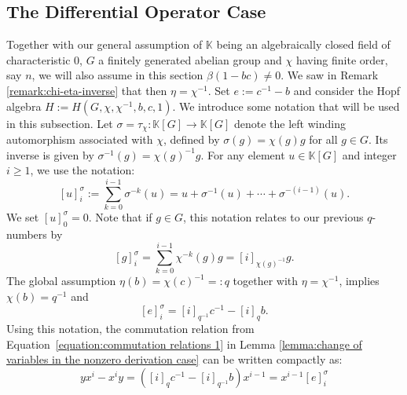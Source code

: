 \documentclass[11pt, twoside]{amsart}
\theoremstyle{definition}
\newcommand{\KK}{\mathbb{K}}
\newcommand{\wind}[2]{[#1]_{#2}^{\sigma}}
\begin{document}
%
\subsection{The Differential Operator Case}
%

Together with our general assumption of $\KK$ being an algebraically closed field of characteristic $0$, $G$ a finitely generated abelian group and  $\chi$ having finite order, say $n$, we will also assume  in this section $\beta(1 - bc) \neq 0$.  We saw in Remark \ref{remark:chi-eta-inverse} that then $\eta=\chi^{-1}$. Set $e:=c^{-1}-b$ and consider the Hopf algebra $H := H(G, \chi, \chi^{-1}, b, c, 1)$. We introduce some notation that will be used in this subsection. Let $\sigma=\tau_\chi: \KK[G] \to \KK[G]$ denote the left winding automorphism associated with $\chi$, defined by $\sigma(g) = \chi(g)g$ for all $g \in G$. Its inverse is given by $\sigma^{-1}(g) = \chi(g)^{-1}g$. For any element $u \in \KK[G]$ and integer $i \geq 1$, we use the notation:
%
\[ \wind{u}{i} := \sum_{k=0}^{i-1} \sigma^{-k}(u) = u + \sigma^{-1}(u) + \cdots + \sigma^{-(i-1)}(u). \]
%
We set $\wind{u}{0} = 0$. Note that if $g \in G$, this notation relates to our previous $q$-numbers by 
%
\[ \wind{g}{i} = \sum_{k=0}^{i-1} \chi^{-k}(g) g =  [i]_{\chi(g)^{-1}} g. \]
%
The global assumption  $\eta(b) = \chi(c)^{-1}=:q$ together with $\eta = \chi^{-1}$,  implies $\chi(b) = q^{-1}$ and 
%
\begin{equation}\label{eq:wind}
 \wind{e}{i} = [i]_{q^{-1}} c^{-1} - [i]_q b. 
 \end{equation}
%
Using this notation, the commutation relation from Equation~\eqref{equation:commutation relations 1} in Lemma \ref{lemma:change of variables in the nonzero derivation case} can be written compactly as:
\begin{equation}\label{equation:new commutation equation}
    yx^i - x^i y = \left([i]_q c^{-1} - [i]_{q^{-1}} b\right)x^{i-1} = x^{i-1} \wind{e}{i}
\end{equation}

\medskip
\end{document}
